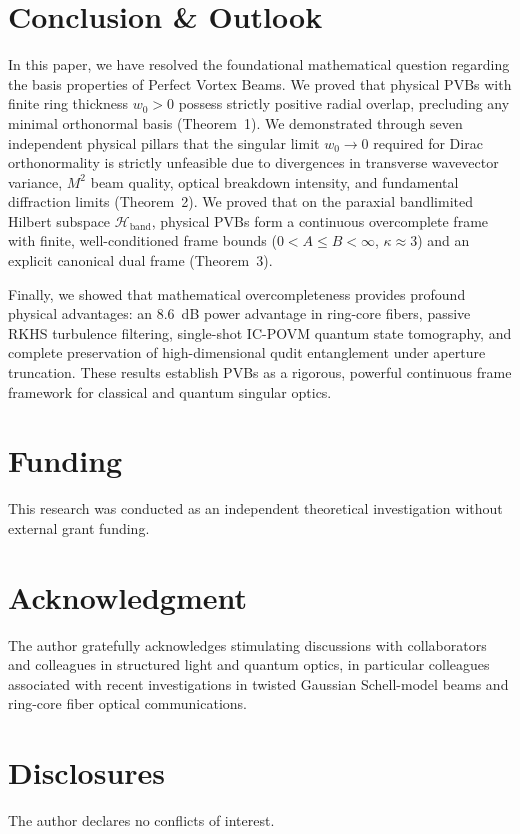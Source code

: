 \documentclass[11pt,a4paper]{article}
\begin{document}
\section{Conclusion \& Outlook}
\label{sec:conclusion}

In this paper, we have resolved the foundational mathematical question regarding the basis properties of Perfect Vortex Beams. We proved that physical PVBs with finite ring thickness $w_0 > 0$ possess strictly positive radial overlap, precluding any minimal orthonormal basis (Theorem~1). We demonstrated through seven independent physical pillars that the singular limit $w_0 \to 0$ required for Dirac orthonormality is strictly unfeasible due to divergences in transverse wavevector variance, $M^2$ beam quality, optical breakdown intensity, and fundamental diffraction limits (Theorem~2). We proved that on the paraxial bandlimited Hilbert subspace $\mathcal{H}_{\text{band}}$, physical PVBs form a continuous overcomplete frame with finite, well-conditioned frame bounds ($0 < A \le B < \infty$, $\kappa \approx 3$) and an explicit canonical dual frame (Theorem~3).

Finally, we showed that mathematical overcompleteness provides profound physical advantages: an 8.6~dB power advantage in ring-core fibers, passive RKHS turbulence filtering, single-shot IC-POVM quantum state tomography, and complete preservation of high-dimensional qudit entanglement under aperture truncation. These results establish PVBs as a rigorous, powerful continuous frame framework for classical and quantum singular optics.

\section*{Funding}
This research was conducted as an independent theoretical investigation without external grant funding.

\section*{Acknowledgment}
The author gratefully acknowledges stimulating discussions with collaborators and colleagues in structured light and quantum optics, in particular colleagues associated with recent investigations in twisted Gaussian Schell-model beams and ring-core fiber optical communications.

\section*{Disclosures}
The author declares no conflicts of interest.
\end{document}
